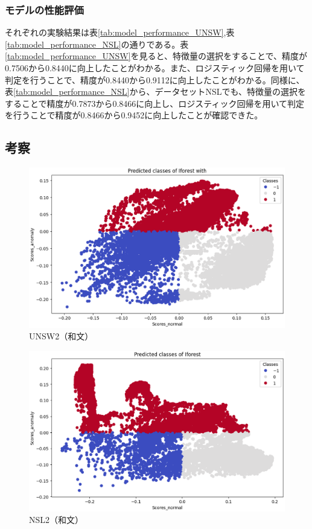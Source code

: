 \documentclass{css}
\begin{document}
\subsubsection{モデルの性能評価}
それぞれの実験結果は表\ref{tab:model_performance_UNSW},表\ref{tab:model_performance_NSL}の通りである。表\ref{tab:model_performance_UNSW}を見ると、特徴量の選択をすることで、精度が0.7506から0.8440に向上したことがわかる。また、ロジスティック回帰を用いて判定を行うことで、精度が0.8440から0.9112に向上したことがわかる。同様に、表\ref{tab:model_performance_NSL}から、データセットNSLでも、特徴量の選択をすることで精度が0.7873から0.8466に向上し、ロジスティック回帰を用いて判定を行うことで精度が0.8466から0.9452に向上したことが確認できた。

\subsection{考察}

\begin{figure}
    \centering
    \includegraphics[width=\linewidth]{pictures/eps/UNSW2.eps}
    \caption{UNSW2（和文）}
    \label{fig:UNSW2}
\end{figure}

\begin{figure}
    \centering
    \includegraphics[width=\linewidth]{pictures/eps/NSL2.eps}
    \caption{NSL2（和文）}
    \label{fig:NSL2}
\end{figure}
\end{document}
